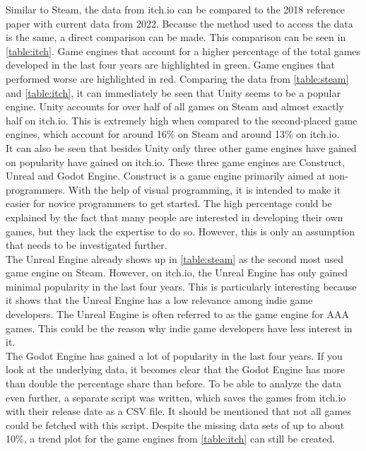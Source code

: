 Similar to Steam, the data from itch.io can be compared to the 2018 reference paper with current data from 2022.
Because the method used to access the data is the same, a direct comparison can be made.
This comparison can be seen in \autoref{table:itch}.
Game engines that account for a higher percentage of the total games developed in the last four years are highlighted in green.
Game engines that performed worse are highlighted in red.
Comparing the data from \autoref{table:steam} and \autoref{table:itch}, it can immediately be seen that Unity seems to be a popular engine.
Unity accounts for over half of all games on Steam and almost exactly half on itch.io.
This is extremely high when compared to the second-placed game engines, which account for around 16\% on Steam and around 13\% on itch.io.\\

It can also be seen that besides Unity only three other game engines have gained on popularity have gained on itch.io.
These three game engines are Construct, Unreal and Godot Engine.
Construct is a game engine primarily aimed at non-programmers.
With the help of visual programming, it is intended to make it easier for novice programmers to get started.
The high percentage could be explained by the fact that many people are interested in developing their own games, but they lack the expertise to do so.
However, this is only an assumption that needs to be investigated further. \\

The Unreal Engine already shows up in \autoref{table:steam} as the second most used game engine on Steam.
However, on itch.io, the Unreal Engine has only gained minimal popularity in the last four years.
This is particularly interesting because it shows that the Unreal Engine has a low relevance among indie game developers.
The Unreal Engine is often referred to as the game engine for AAA games\cite{unreal-tripple-a-yager}\cite{unreal-tripple-a-india}.
This could be the reason why indie game developers have less interest in it. \\

The Godot Engine has gained a lot of popularity in the last four years.
If you look at the underlying data, it becomes clear that the Godot Engine has more than double the percentage share than before.
To be able to analyze the data even further, a separate script was written, which saves the games from itch.io with their release date as a CSV file\cite{github-trend-itch}.
It should be mentioned that not all games could be fetched with this script.
Despite the missing data sets of up to about 10\%, a trend plot for the game engines from \autoref{table:itch} can still be created.

